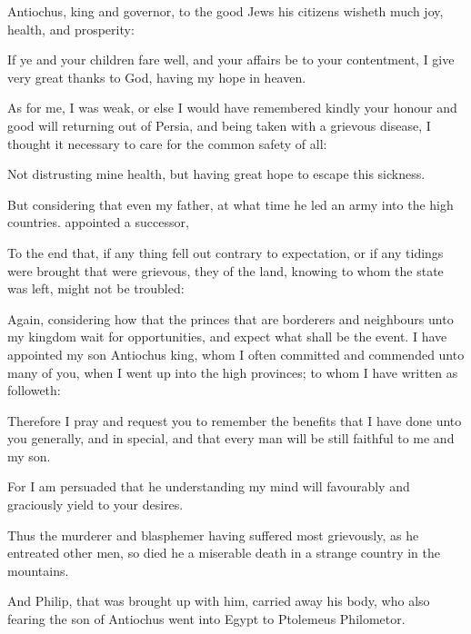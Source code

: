 {\par }{\PP {}Antiochus, king and governor, to the good Jews his citizens wisheth much joy, health, and prosperity:
\par }{\PP {}If ye and your children fare well, and your affairs be to your contentment, I give very great thanks to God, having my hope in heaven.
\par }{\PP {}As for me, I was weak, or else I would have remembered kindly your honour and good will returning out of Persia, and being taken with a grievous disease, I thought it necessary to care for the common safety of all:
\par }{\PP {}Not distrusting mine health, but having great hope to escape this sickness.
\par }{\PP {}But considering that even my father, at what time he led an army into the high countries. appointed a successor,
\par }{\PP {}To the end that, if any thing fell out contrary to expectation, or if any tidings were brought that were grievous, they of the land, knowing to whom the state was left, might not be troubled:
\par }{\PP {}Again, considering how that the princes that are borderers and neighbours unto my kingdom wait for opportunities, and expect what shall be the event. I have appointed my son Antiochus king, whom I often committed and commended unto many of you, when I went up into the high provinces; to whom I have written as followeth:
\par }{\PP {}Therefore I pray and request you to remember the benefits that I have done unto you generally, and in special, and that every man will be still faithful to me and my son.
\par }{\PP {}For I am persuaded that he understanding my mind will favourably and graciously yield to your desires.
\par }{\PP {}Thus the murderer and blasphemer having suffered most grievously, as he entreated other men, so died he a miserable death in a strange country in the mountains.
\par }{\PP {}And Philip, that was brought up with him, carried away his body, who also fearing the son of Antiochus went into Egypt to Ptolemeus Philometor.

}
